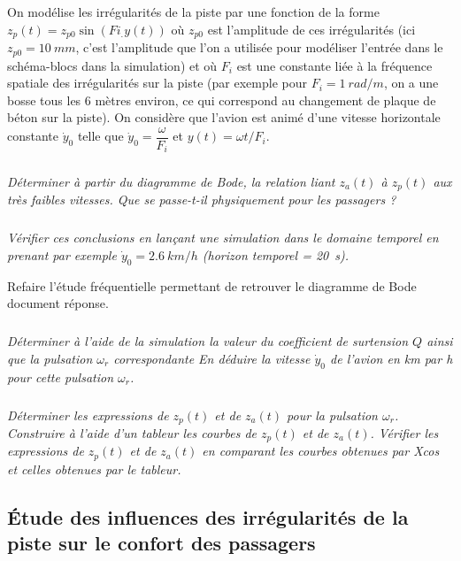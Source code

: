 \documentclass[10pt,fleqn]{article} %
\begin{document}
\begin{multicols}{2}
On modélise les irrégularités de la piste par une fonction de la forme $z_p(t) = z_{p0}\sin(Fi_.y(t))$ où $z_{p0}$ est l’amplitude
de ces irrégularités (ici $z_{p0}=\SI{10}{mm}$, c’est l’amplitude que l’on a utilisée pour modéliser l’entrée dans le schéma-blocs dans la simulation) et où $F_i$ est une constante liée à la fréquence spatiale des irrégularités sur la piste 
(par exemple pour $F_i = \SI{1}{rad/m}$, on a une bosse tous les 6 mètres environ, ce qui
 correspond au changement de plaque de béton sur la piste). 
 On considère que l’avion est animé d’une vitesse horizontale 
 constante $\dot{y}_0$ telle que
 $\dot{y}_0 = \dfrac{\omega}{F_i}$  et 
 $y(t)=\omega t /F_i$.


\subparagraph{}
\textit{Déterminer à partir du diagramme de Bode, la relation liant $z_a(t)$ à $z_p(t)$ aux très faibles vitesses. Que se passe-t-il physiquement pour les passagers ?}
\ifprof
\begin{corrige}
\end{corrige}
\else
\fi


\subparagraph{}
\textit{Vérifier ces conclusions en lançant une simulation dans le domaine temporel en prenant par exemple $\dot{y}_0=\SI{2,6}{km/h}$ (horizon temporel = \SI{20}{s}).}
\ifprof
\begin{corrige}
\end{corrige}
\else
\fi

Refaire l'étude fréquentielle permettant de retrouver le diagramme de Bode document réponse.


\subparagraph{}
\textit{Déterminer à l'aide de la simulation la valeur du coefficient de surtension $Q$ ainsi que la pulsation  $\omega_r$ correspondante En déduire la vitesse $\dot{y}_0$ de l'avion en km par h pour cette pulsation $\omega_r$.}
\ifprof
\begin{corrige}
\end{corrige}
\else
\fi


\subparagraph{}
\textit{Déterminer les expressions de $z_p(t)$ et de $z_a(t)$ pour la pulsation $\omega_r$. Construire à l’aide d’un tableur les
courbes de $z_p(t)$ et de $z_a(t)$. Vérifier les expressions de $z_p(t)$ et de $z_a(t)$ en comparant les courbes obtenues par Xcos et celles obtenues par le tableur.}
\ifprof
\begin{corrige}
\end{corrige}
\else
\fi

\subsection*{Étude des influences des irrégularités de la piste sur le confort des passagers}



\end{multicols}
\end{document}
